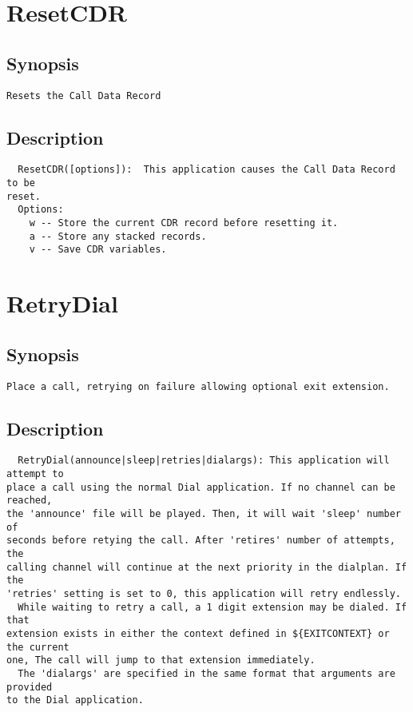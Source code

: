 \section{ResetCDR}
\subsection{Synopsis}
\begin{verbatim}
Resets the Call Data Record
\end{verbatim}
\subsection{Description}
\begin{verbatim}
  ResetCDR([options]):  This application causes the Call Data Record to be
reset.
  Options:
    w -- Store the current CDR record before resetting it.
    a -- Store any stacked records.
    v -- Save CDR variables.

\end{verbatim}


\section{RetryDial}
\subsection{Synopsis}
\begin{verbatim}
Place a call, retrying on failure allowing optional exit extension.
\end{verbatim}
\subsection{Description}
\begin{verbatim}
  RetryDial(announce|sleep|retries|dialargs): This application will attempt to
place a call using the normal Dial application. If no channel can be reached,
the 'announce' file will be played. Then, it will wait 'sleep' number of
seconds before retying the call. After 'retires' number of attempts, the
calling channel will continue at the next priority in the dialplan. If the
'retries' setting is set to 0, this application will retry endlessly.
  While waiting to retry a call, a 1 digit extension may be dialed. If that
extension exists in either the context defined in ${EXITCONTEXT} or the current
one, The call will jump to that extension immediately.
  The 'dialargs' are specified in the same format that arguments are provided
to the Dial application.

\end{verbatim}



